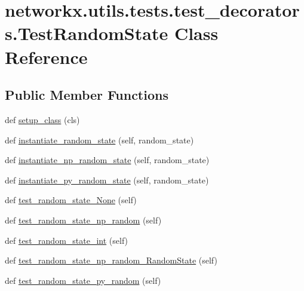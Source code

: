 \hypertarget{classnetworkx_1_1utils_1_1tests_1_1test__decorators_1_1TestRandomState}{}\section{networkx.\+utils.\+tests.\+test\+\_\+decorators.\+Test\+Random\+State Class Reference}
\label{classnetworkx_1_1utils_1_1tests_1_1test__decorators_1_1TestRandomState}
\subsection*{Public Member Functions}
\begin{DoxyCompactItemize}
\item 
def \hyperlink{classnetworkx_1_1utils_1_1tests_1_1test__decorators_1_1TestRandomState_a93378c51a7f96276b1e278c5a4ec214c}{setup\+\_\+class} (cls)
\item 
def \hyperlink{classnetworkx_1_1utils_1_1tests_1_1test__decorators_1_1TestRandomState_ae237ef5e6652fa0e077be968ce775673}{instantiate\+\_\+random\+\_\+state} (self, random\+\_\+state)
\item 
def \hyperlink{classnetworkx_1_1utils_1_1tests_1_1test__decorators_1_1TestRandomState_aafab3cf0b994f09276b780ba313a7bea}{instantiate\+\_\+np\+\_\+random\+\_\+state} (self, random\+\_\+state)
\item 
def \hyperlink{classnetworkx_1_1utils_1_1tests_1_1test__decorators_1_1TestRandomState_abff68c0720dbc5c9f040503d14b488b5}{instantiate\+\_\+py\+\_\+random\+\_\+state} (self, random\+\_\+state)
\item 
def \hyperlink{classnetworkx_1_1utils_1_1tests_1_1test__decorators_1_1TestRandomState_a2b5fb3cf2241df015d20465d43328d8f}{test\+\_\+random\+\_\+state\+\_\+\+None} (self)
\item 
def \hyperlink{classnetworkx_1_1utils_1_1tests_1_1test__decorators_1_1TestRandomState_a24f1f191e70893026c5dd2db41c98aac}{test\+\_\+random\+\_\+state\+\_\+np\+\_\+random} (self)
\item 
def \hyperlink{classnetworkx_1_1utils_1_1tests_1_1test__decorators_1_1TestRandomState_ab4f8bd5d6c32276ac07409204a3907e7}{test\+\_\+random\+\_\+state\+\_\+int} (self)
\item 
def \hyperlink{classnetworkx_1_1utils_1_1tests_1_1test__decorators_1_1TestRandomState_abfd7fc4c4097667f7574aa71b194e028}{test\+\_\+random\+\_\+state\+\_\+np\+\_\+random\+\_\+\+Random\+State} (self)
\item 
def \hyperlink{classnetworkx_1_1utils_1_1tests_1_1test__decorators_1_1TestRandomState_ac5e4cb934e32442583d9372f793c1290}{test\+\_\+random\+\_\+state\+\_\+py\+\_\+random} (self)
\end{DoxyCompactItemize}


